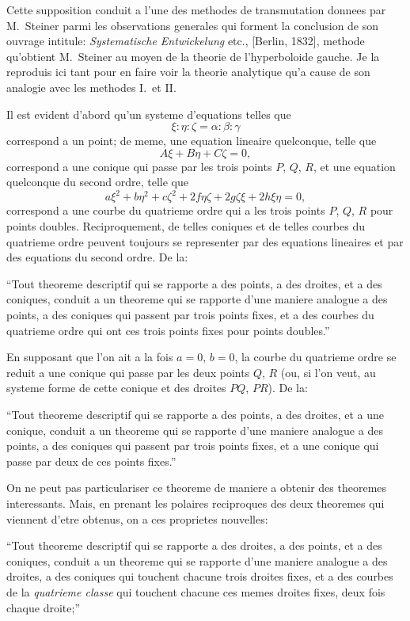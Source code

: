 \documentclass[12pt,a4paper]{article}
\begin{document}
Cette supposition conduit a l'une des methodes de transmutation donnees par M.~Steiner parmi les observations generales qui forment la conclusion de son ouvrage intitule: \textit{Systematische Entwickelung} etc., [Berlin, 1832], methode qu'obtient M.~Steiner au moyen de la theorie de l'hyperboloide gauche. Je la reproduis ici tant pour en faire voir la theorie analytique qu'a cause de son analogie avec les methodes I.\ et II.

Il est evident d'abord qu'un systeme d'equations telles que
\[
\xi : \eta : \zeta = \alpha : \beta : \gamma
\]
correspond a un point; de meme, une equation lineaire quelconque, telle que
\[
A\xi + B\eta + C\zeta = 0,
\]
correspond a une conique qui passe par les trois points $P$, $Q$, $R$, et une equation quelconque du second ordre, telle que
\[
a\xi^2 + b\eta^2 + c\zeta^2 + 2f\eta\zeta + 2g\zeta\xi + 2h\xi\eta = 0,
\]
correspond a une courbe du quatrieme ordre qui a les trois points $P$, $Q$, $R$ pour points doubles. Reciproquement, de telles coniques et de telles courbes du quatrieme ordre peuvent toujours se representer par des equations lineaires et par des equations du second ordre. De la:

``Tout theoreme descriptif qui se rapporte a des points, a des droites, et a des coniques, conduit a un theoreme qui se rapporte d'une maniere analogue a des points, a des coniques qui passent par trois points fixes, et a des courbes du quatrieme ordre qui ont ces trois points fixes pour points doubles.''

En supposant que l'on ait a la fois $a = 0$, $b = 0$, la courbe du quatrieme ordre se reduit a une conique qui passe par les deux points $Q$, $R$ (ou, si l'on veut, au systeme forme de cette conique et des droites $PQ$, $PR$). De la:

``Tout theoreme descriptif qui se rapporte a des points, a des droites, et a une conique, conduit a un theoreme qui se rapporte d'une maniere analogue a des points, a des coniques qui passent par trois points fixes, et a une conique qui passe par deux de ces points fixes.''

On ne peut pas particulariser ce theoreme de maniere a obtenir des theoremes interessants. Mais, en prenant les polaires reciproques des deux theoremes qui viennent d'etre obtenus, on a ces proprietes nouvelles:

``Tout theoreme descriptif qui se rapporte a des droites, a des points, et a des coniques, conduit a un theoreme qui se rapporte d'une maniere analogue a des droites, a des coniques qui touchent chacune trois droites fixes, et a des courbes de la \textit{quatrieme classe} qui touchent chacune ces memes droites fixes, deux fois chaque droite;''
\end{document}
